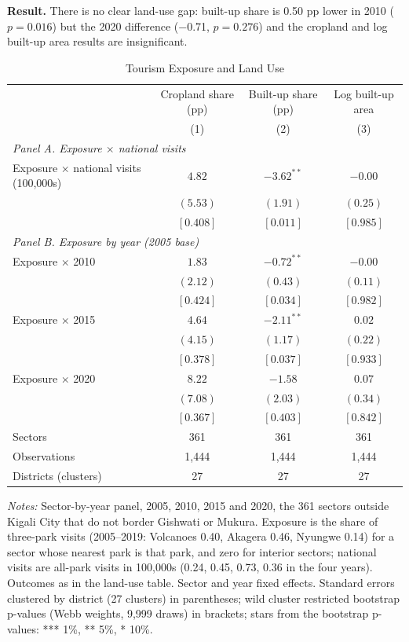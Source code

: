 \documentclass[11pt]{article}
\begin{document}
\textbf{Result.} There is no clear land-use gap: built-up share is 0.50 pp lower in 2010 ($p=0.016$) but the 2020 difference ($-$0.71, $p=0.276$) and the cropland and log built-up area results are insignificant.
\clearpage
\begin{table}[H]
\centering\small\setlength{\tabcolsep}{4pt}
\caption{Tourism Exposure and Land Use}
\label{tab:shift_land}
\begin{tabular}{lccc}
\toprule
 & Cropland share (pp) & Built-up share (pp) & Log built-up area \\
 & (1) & (2) & (3) \\
\midrule
\multicolumn{4}{l}{\textit{Panel A. Exposure $\times$ national visits}} \\
Exposure $\times$ national visits (100,000s) & $4.82$ & $-3.62^{**}$ & $-0.00$ \\
 & $(5.53)$ & $(1.91)$ & $(0.25)$ \\
 & $[0.408]$ & $[0.011]$ & $[0.985]$ \\
\multicolumn{4}{l}{\textit{Panel B. Exposure by year (2005 base)}} \\
Exposure $\times$ 2010 & $1.83$ & $-0.72^{**}$ & $-0.00$ \\
 & $(2.12)$ & $(0.43)$ & $(0.11)$ \\
 & $[0.424]$ & $[0.034]$ & $[0.982]$ \\
Exposure $\times$ 2015 & $4.64$ & $-2.11^{**}$ & $0.02$ \\
 & $(4.15)$ & $(1.17)$ & $(0.22)$ \\
 & $[0.378]$ & $[0.037]$ & $[0.933]$ \\
Exposure $\times$ 2020 & $8.22$ & $-1.58$ & $0.07$ \\
 & $(7.08)$ & $(2.03)$ & $(0.34)$ \\
 & $[0.367]$ & $[0.403]$ & $[0.842]$ \\
\midrule
Sectors & 361 & 361 & 361 \\
Observations & 1,444 & 1,444 & 1,444 \\
Districts (clusters) & 27 & 27 & 27 \\
\bottomrule
\end{tabular}
\begin{minipage}{0.95\textwidth}\footnotesize
\textit{Notes:} Sector-by-year panel, 2005, 2010, 2015 and 2020, the 361 sectors outside Kigali City that do not border Gishwati or Mukura. Exposure is the share of three-park visits (2005--2019: Volcanoes 0.40, Akagera 0.46, Nyungwe 0.14) for a sector whose nearest park is that park, and zero for interior sectors; national visits are all-park visits in 100,000s (0.24, 0.45, 0.73, 0.36 in the four years). Outcomes as in the land-use table. Sector and year fixed effects. Standard errors clustered by district (27 clusters) in parentheses; wild cluster restricted bootstrap p-values (Webb weights, 9,999 draws) in brackets; stars from the bootstrap p-values: *** 1\%, ** 5\%, * 10\%.
\end{minipage}
\end{table}
\end{document}
